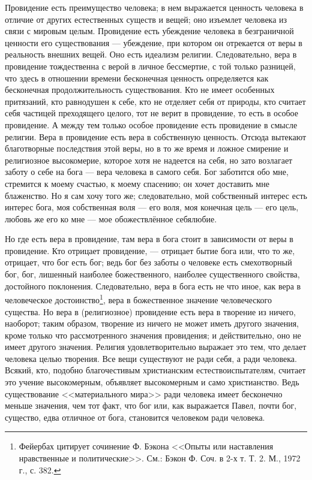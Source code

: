 \documentclass[12pt,oneside]{book}
\begin{document}
Провидение есть преимущество человека; в нем выражается ценность человека в отличие от других естественных существ и вещей; оно изъемлет человека из связи с мировым целым. Провидение есть убеждение человека в безграничной ценности его существования --- убеждение, при котором он отрекается от веры в реальность внешних вещей. Оно есть идеализм религии. Следовательно, вера в провидение тождественна с верой в личное бессмертие, с той только разницей, что здесь в отношении времени бесконечная ценность определяется как бесконечная продолжительность существования. Кто не имеет особенных притязаний, кто равнодушен к себе, кто не отделяет себя от природы, кто считает себя частицей преходящего целого, тот не верит в провидение, то есть в особое провидение. А между тем только особое провидение есть провидение в смысле религии. Вера в провидение есть вера в собственную ценность. Отсюда вытекают благотворные последствия этой веры, но в то же время и ложное смирение и религиозное высокомерие, которое хотя не надеется на себя, но зато возлагает заботу о себе на бога --- вера человека в самого себя. Бог заботится обо мне, стремится к моему счастью, к моему спасению; он хочет доставить мне блаженство. Но я сам хочу того же; следовательно, мой собственный интерес есть интерес бога, моя собственная воля --- его воля, моя конечная цель --- его цель, любовь же его ко мне --- мое обожествлённое себялюбие.

Но где есть вера в провидение, там вера в бога стоит в зависимости от веры в провидение. Кто отрицает провидение, --- отрицает бытие бога или, что то же, отрицает, что бог есть бог; ведь бог без заботы о человеке есть смехотворный бог, бог, лишенный наиболее божественного, наиболее существенного свойства, достойного поклонения. Следовательно, вера в бога есть не что иное, как вера в человеческое достоинство\ddag\let\svthefootnote\thefootnote\let\thefootnote\relax{}\let\thefootnote\svthefootnote\footnote{Фейербах цитирует сочинение Ф. Бэкона <<Опыты или наставления нравственные и политические>>. См.: Бэкон Ф. Соч. в 2-х т. Т. 2. М., 1972 г., с. 382.}, вера в божественное значение человеческого существа. Но вера в (религиозное) провидение есть вера в творение из ничего, наоборот; таким образом, творение из ничего не может иметь другого значения, кроме только что рассмотренного значения провидения; и действительно, оно не имеет другого значения. Религия удовлетворительно выражает это тем, что делает человека целью творения. Все вещи существуют не ради себя, а ради человека. Всякий, кто, подобно благочестивым христианским естествоиспытателям, считает это учение высокомерным, объявляет высокомерным и само христианство. Ведь существование <<материального мира>> ради человека имеет бесконечно меньше значения, чем тот факт, что бог или, как выражается Павел, почти бог, существо, едва отличное от бога, становится человеком ради человека.
\end{document}
